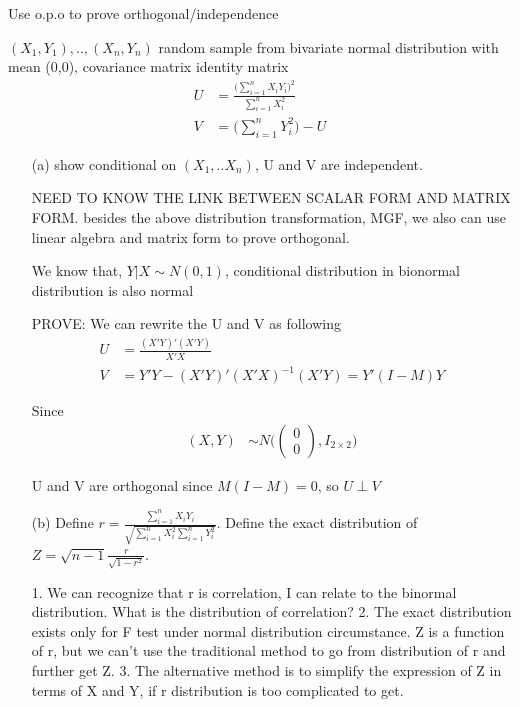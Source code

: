 Use o.p.o to prove orthogonal/independence

$(X_1, Y_1), .., (X_n, Y_n)$ random sample from bivariate normal distribution with mean (0,0), covariance matrix identity matrix
\begin{align*}
U &= \frac{\Big( \sum_{i=1}^n X_i Y_i \Big) ^2}{\sum_{i=1}^n X_i^2} \\
V &= \Big( \sum_{i=1}^n Y_i^2 \Big) - U
\end{align*}

\begin{itemize}
\item[(a)] show conditional on $(X_1,..X_n)$, U and V are independent. 

NEED TO KNOW THE LINK BETWEEN SCALAR FORM AND MATRIX FORM. besides the above distribution transformation, MGF, we also can use linear algebra and matrix form to prove orthogonal. 

We know that, 
$Y | X \sim N(0,1)$, conditional distribution in bionormal distribution is also normal

PROVE:
We can rewrite the U and V as following
\begin{align*}
U &= \frac{ (X'Y)' (X'Y)}{X'X} \\
V &= Y'Y - (X'Y)' ({X'X} )^{-1}(X'Y) = Y'(I-M)Y
\end{align*}

Since 
\begin{align*}
(X, Y) & \sim N \Big( \begin{pmatrix}
0 \\
0
\end{pmatrix} , I_{2 \times 2}\Big) 
\end{align*}

U and V are orthogonal since $M(I-M) = 0$, so $U \perp V$

\item[(b)] Define $r = \frac{\sum_{i=1}^n X_i Y_i}{\sqrt {\sum_{i=1}^n X_i^2 \sum_{i=1}^n Y_i^2}}$. Define the exact distribution of $Z=\sqrt{n-1} \frac{r}{\sqrt{1- r^2}}$.

1. We can recognize that r is correlation, I can relate to the binormal distribution. What is the distribution of correlation? 
2. The exact distribution exists only for F test under normal distribution circumstance. Z is a function of r, but we can't use the traditional method to go from distribution of r and further get Z.
3. The alternative method is to simplify the expression of Z in terms of X and Y, if r distribution is too complicated to get. 


\end{itemize}
